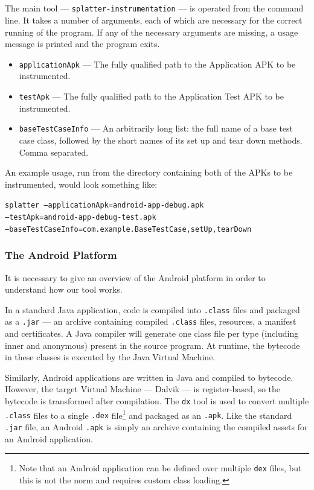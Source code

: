 \subsection{\splatterinst{}}

The main tool --- {\tt splatter-instrumentation} --- is operated from the command line. It takes a number of arguments, each of which are necessary for the correct running of the program. If any of the necessary arguments are missing, a usage message is printed and the program exits.

\begin{itemize}
    \item {\tt applicationApk} --- The fully qualified path to the Application APK to be instrumented.
    \item {\tt testApk} --- The fully qualified path to the Application Test APK to be instrumented.
    \item {\tt baseTestCaseInfo} --- An arbitrarily long list: the full name of a base test case class, followed by the short names of its set up and tear down methods. Comma separated.
\end{itemize}

An example usage, run from the directory containing both of the APKs to be instrumented, would look something like:

\texttt{splatter --applicationApk=android-app-debug.apk\\--testApk=android-app-debug-test.apk\\--baseTestCaseInfo=com.example.BaseTestCase,setUp,tearDown}

\subsubsection{The Android Platform}

It is necessary to give an overview of the Android platform in order to understand how our \splatterinst{} tool works.

In a standard Java application, code is compiled into {\tt .class} files and packaged as a {\tt .jar} --- an archive containing compiled {\tt .class} files, resources, a manifest and certificates. A Java compiler will generate one class file per type (including inner and anonymous) present in the source program. At runtime, the bytecode in these classes is executed by the Java Virtual Machine.

Similarly, Android applications are written in Java and compiled to bytecode. However, the target Virtual Machine --- Dalvik --- is register-based, so the bytecode is transformed after compilation. The {\tt dx} tool is used to convert multiple {\tt .class} files to a single {\tt .dex} file\footnote{Note that an Android application can be defined over multiple {\tt dex} files, but this is not the norm and requires custom class loading.} and packaged as an {\tt .apk}. Like the standard {\tt .jar} file, an Android {\tt .apk} is simply an archive containing the compiled assets for an Android application.

